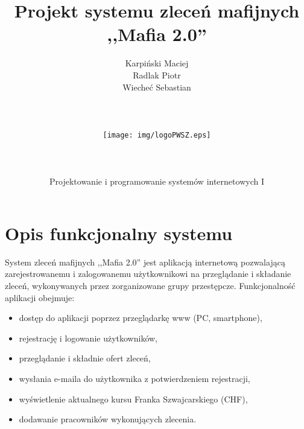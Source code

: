 \documentclass[12pt,a4paper]{article}
\author{Karpiński Maciej\\Radlak Piotr\\Wiecheć Sebastian\\\\\\\\\texttt{[image: img/logoPWSZ.eps]}\\\\\\\\Projektowanie i programowanie systemów internetowych I}
\title{Projekt systemu zleceń mafijnych\\,,Mafia 2.0''}
\begin{document}
	\maketitle
	\thispagestyle{empty}
	\clearpage

	\tableofcontents
	\newpage

	\section{Opis funkcjonalny systemu}
		\indent System zleceń mafijnych ,,Mafia 2.0'' jest aplikacją internetową pozwalającą zarejestrowanemu i zalogowanemu użytkownikowi na przeglądanie i składanie zleceń,
		wykonywanych przez zorganizowane grupy przestępcze. Funkcjonalność aplikacji obejmuje:
		\begin{itemize}
			\item dostęp do aplikacji poprzez przeglądarkę www (PC, smartphone),
			\item rejestrację i logowanie użytkowników,
			\item przeglądanie i składnie ofert zleceń,
			\item wysłania e-maila do użytkownika z potwierdzeniem rejestracji,
			\item wyświetlenie aktualnego kursu Franka Szwajcarskiego (CHF),
			\item dodawanie pracowników wykonujących zlecenia.
		\end{itemize}
	\newpage

\end{document}
